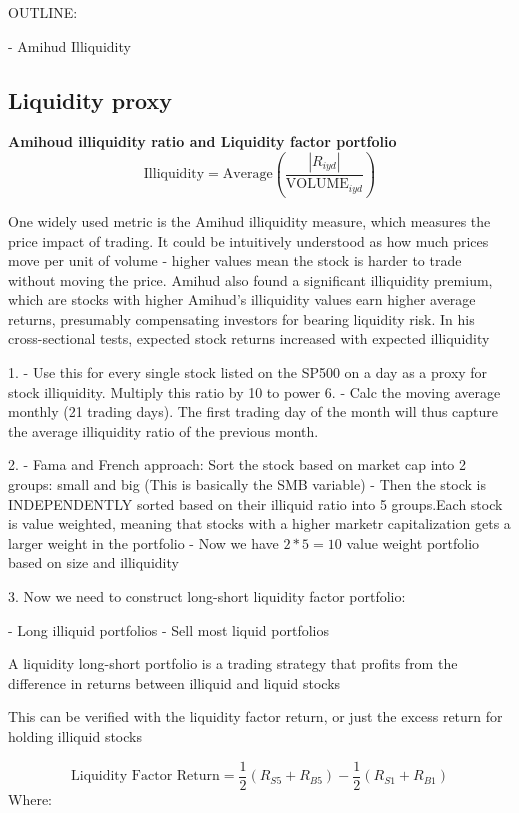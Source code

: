 OUTLINE:

- Amihud Illiquidity

\subsection{Liquidity proxy}

\textbf{Amihoud illiquidity ratio and Liquidity factor portfolio}
$$\text{Illiquidity} = \text{Average} \left( \frac{|R_{iyd}|}{\text{VOLUME}_{iyd}} \right)
$$

One widely used metric is the Amihud illiquidity measure, which measures the price impact of trading. It could be intuitively understood as how much prices move per unit of volume - higher values mean the stock is harder to trade without moving the price. Amihud also found a significant illiquidity premium, which are stocks with higher Amihud's illiquidity values earn higher average returns, presumably compensating investors for bearing liquidity risk. In his cross-sectional tests, expected stock returns increased with expected illiquidity \cite{amihud_2002}


1.
- Use this for every single stock listed on the SP500 on a day as a proxy for stock illiquidity. Multiply this ratio by 10 to power 6. 
- Calc the moving average monthly (21 trading days). The first trading day of the month will thus capture the average illiquidity ratio of the previous month.

2.
- Fama and French approach: Sort the stock based on market cap into 2 groups: small and big (This is basically the SMB variable)
- Then the stock is INDEPENDENTLY sorted based on their illiquid ratio into 5 groups.Each stock is value weighted, meaning that stocks with a higher marketr capitalization gets a larger weight in the portfolio
- Now we have $2*5=10$ value weight portfolio based on size and illiquidity


3.
Now we need to construct long-short liquidity factor portfolio:

- Long illiquid portfolios
- Sell most liquid portfolios

A liquidity long-short portfolio is a trading strategy that profits from the difference in returns between illiquid and liquid stocks

This can be verified with the liquidity factor return, or just the excess return for holding illiquid stocks

$$
\text{Liquidity Factor Return} = \frac{1}{2} \left( R_{S5} + R_{B5} \right) - \frac{1}{2} \left( R_{S1} + R_{B1} \right)
$$
Where:

